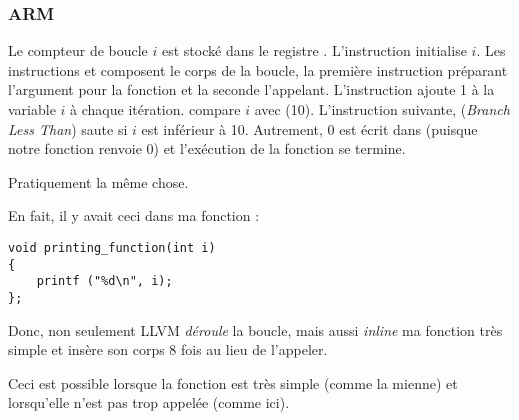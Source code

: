 \subsubsection{ARM}

\myparagraph{\NonOptimizingKeilVI (\ARMMode)}



Le compteur de boucle $i$ est stocké dans le registre .
L'instruction  initialise $i$.
Les instructions  et  composent le corps
de la boucle, la première instruction préparant l'argument pour la fonction \ttf
et la seconde l'appelant.
L'instruction  ajoute 1 à la variable $i$ à chaque itération.
 compare $i$ avec  (10). 
L'instruction suivante,  (\emph{Branch Less Than}) saute si $i$ est inférieur
à 10.
Autrement, 0 est écrit dans  (puisque notre fonction renvoie 0) et l'exécution
de la fonction se termine.

\myparagraph{\OptimizingKeilVI (\ThumbMode)}



Pratiquement la même chose.

\myparagraph{\OptimizingXcodeIV (\ThumbTwoMode)}
\label{ARM_unrolled_loops}



En fait, il y avait ceci dans ma fonction \ttf:

\begin{lstlisting}[style=customc]
void printing_function(int i)
{
    printf ("%d\n", i);
};
\end{lstlisting}

Donc, non seulement LLVM \emph{déroule} la boucle, mais aussi \emph{inline} ma fonction
très simple et insère son corps 8 fois au lieu de l'appeler.

Ceci est possible lorsque la fonction est très simple (comme la mienne) et lorsqu'elle
n'est pas trop appelée (comme ici).







